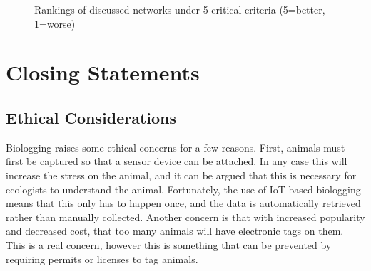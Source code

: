 \documentclass[sigplan,screen,nonacm]{acmart}
\begin{document}
\begin{figure}[htbp]
  \centering
  \caption{Rankings of discussed networks under 5 critical criteria (5=better, 1=worse)}
  \label{fig:network_barplot}
\end{figure}

\section{Closing Statements}
\label{sec:Closing Statements}

\subsection{Ethical Considerations}
\label{sec:Ethical Considerations}

Biologging raises some ethical concerns for a few reasons. First, animals must first be captured so that a sensor device can be 
attached. In any case this will increase the stress on the animal, and it can be argued that this is necessary for ecologists to understand the animal. 
Fortunately, the use of IoT based biologging means that this only has to happen once, and the data is automatically retrieved rather than manually 
collected. Another concern is that with increased popularity and decreased cost, that too many animals will have electronic tags on them. This is a 
real concern, however this is something that can be prevented by requiring permits or licenses to tag animals.
\end{document}
